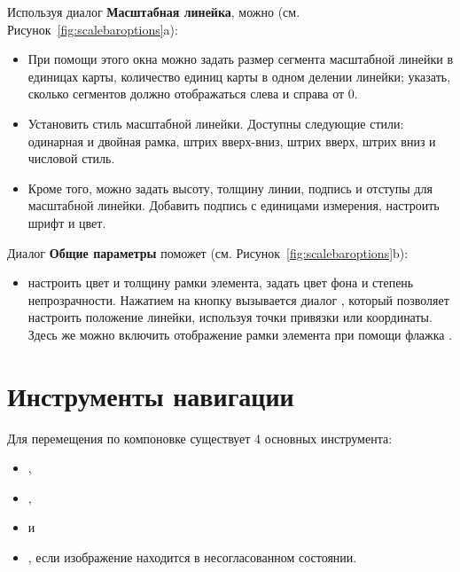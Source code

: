 
Используя диалог \textbf{Масштабная линейка}, можно
(см. Рисунок~\ref{fig:scalebaroptions}a):

\begin{itemize}[label=--]
\item При помощи этого окна можно задать размер сегмента масштабной
линейки в единицах карты, количество единиц карты в одном делении
линейки; указать, сколько сегментов должно отображаться слева и справа
от 0.
\item Установить стиль масштабной линейки. Доступны следующие стили:
одинарная и двойная рамка, штрих вверх-вниз, штрих вверх, штрих вниз и
числовой стиль.
\item Кроме того, можно задать высоту, толщину линии, подпись и отступы
для масштабной линейки. Добавить подпись с единицами измерения, настроить
шрифт и цвет.
\end{itemize}


Диалог \textbf{Общие параметры} поможет (см. Рисунок~\ref{fig:scalebaroptions}b):

\begin{itemize}[label=--]
\item настроить цвет и толщину рамки элемента, задать цвет фона и
степень непрозрачности. Нажатием на кнопку 
вызывается диалог , который позволяет
настроить положение линейки, используя точки привязки или координаты.
Здесь же можно включить отображение рамки элемента при помощи флажка
.
\end{itemize}

\section{Инструменты навигации}

Для перемещения по компоновке существует 4 основных инструмента:

\begin{itemize}[label=--]
\item {},
\item {},
\item {} и
\item {}, если изображение находится в
несогласованном состоянии.
\end{itemize}

